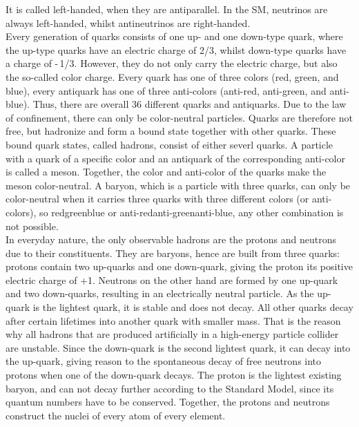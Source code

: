 It is called left-handed, when they are antiparallel.
In the SM, neutrinos are always left-handed, whilst antineutrinos are right-handed.\\
Every generation of quarks consists of one up- and one down-type quark, where the up-type quarks have an electric charge of 2/3, whilst down-type quarks have a charge of -\,1/3.
However, they do not only carry the electric charge, but also the so-called color charge.
Every quark has one of three colors (red, green, and blue), every antiquark has one of three anti-colors (anti-red, anti-green, and anti-blue).
Thus, there are overall 36 different quarks and antiquarks.
Due to the law of confinement, there can only be color-neutral particles.
Quarks are therefore not free, but hadronize and form a bound state together with other quarks.
These bound quark states, called hadrons, consist of either severl quarks.
A particle with a quark of a specific color and an antiquark of the corresponding anti-color is called a meson.
Together, the color and anti-color of the quarks make the meson color-neutral.
A baryon, which is a particle with three quarks, can only be color-neutral when it carries three quarks with three different colors (or anti-colors), so red\textendash green\textendash blue or anti-red\textendash anti-green\textendash anti-blue, any other combination is not possible.
\\In everyday nature, the only observable hadrons are the protons and neutrons due to their constituents.
They are baryons, hence are built from three quarks:
protons contain two up-quarks and one down-quark, giving the proton its positive electric charge of +1.
Neutrons on the other hand are formed by one up-quark and two down-quarks, resulting in an electrically neutral particle. 
As the up-quark is the lightest quark, it is stable and does not decay.
All other quarks decay after certain lifetimes into another quark with smaller mass.
That is the reason why all hadrons that are produced artificially in a high-energy particle collider are unstable.
Since the down-quark is the second lightest quark, it can decay into the up-quark, giving reason to the spontaneous decay of free neutrons into protons when one of the down-quark decays.
The proton is the lightest existing baryon, and can not decay further according to the Standard Model, since its quantum numbers have to be conserved.
Together, the protons and neutrons construct the nuclei of every atom of every element.
